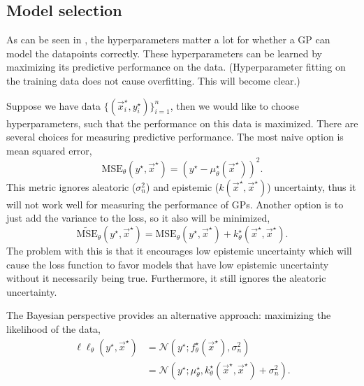 \subsection{Model selection}


As can be seen in
,
the hyperparameters matter a lot for whether a GP can model the datapoints
correctly. These hyperparameters can be learned by maximizing its predictive
performance on the data. (Hyperparameter fitting on the training data does not
cause overfitting. This will become clear.)

Suppose we have data $\{(\vec{x}_i^\star,y_i^\star)\}_{i=1}^n$, then we would
like to choose hyperparameters, such that the performance on this data is
maximized. There are several choices for measuring predictive performance.
The most naive option is mean squared error, \[
  \text{MSE}_{\theta}(y^\star,\vec{x}^\star) = (y^\star - \mu_{\theta}^\star(\vec{x}^\star))^2.
\]
This metric ignores aleatoric ($\sigma_n^2$) and epistemic
($k(\vec{x}^\star,\vec{x}^\star)$) uncertainty, thus it will not work well for
measuring the performance of GPs. Another option is to just add the variance
to the loss, so it also will be minimized, \[
  \tilde{\text{MSE}}_{\theta}(y^\star,\vec{x}^\star) = \text{MSE}_{\theta}(y^\star,\vec{x}^\star) + k_{\theta}^\star(\vec{x}^\star,\vec{x}^\star).
\]
The problem with this is that it encourages low epistemic uncertainty which
will cause the loss function to favor models that have low epistemic
uncertainty without it necessarily being true. Furthermore, it still ignores
the aleatoric uncertainty.

The Bayesian perspective provides an alternative approach: maximizing the
likelihood of the data,
\begin{align*}
  \ell \ell_{\theta}(y^\star,\vec{x}^\star) &= \mathcal{N}(y^\star; f_{\theta}^\star(\vec{x}^\star), \sigma_n^2) \\
  &= \mathcal{N}(y^\star; \mu_{\theta}^\star, k_{\theta}^\star(\vec{x}^\star,\vec{x}^\star) + \sigma_n^2).
\end{align*}

